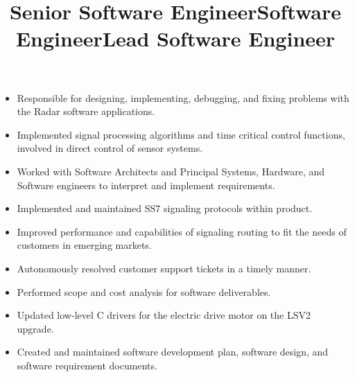 \documentclass[margin]{res}
\begin{document}
\begin{resume}
\title{\textbf{Senior Software Engineer}}
\begin{position}\phantom{spacing}
\begin{itemize}[noitemsep, topsep=0pt]
\item Responsible for designing, implementing, debugging, and fixing problems with the Radar software applications.
\item Implemented signal processing algorithms and time critical control functions, involved in direct control of sensor systems. 
\item Worked with Software Architects and Principal Systems, Hardware, and Software engineers to interpret and implement requirements. 
\end{itemize}
\end{position}

\title{\textbf{Software Engineer}}
\begin{position}\phantom{spacing}
\begin{itemize}[noitemsep, topsep=0pt]
\item Implemented and maintained SS7 signaling protocols within product. 
\item Improved performance and capabilities of signaling routing to fit the needs of customers in emerging markets. 
\item Autonomously resolved customer support tickets in a timely manner. 
\end{itemize}
\end{position}

\title{\textbf{Lead Software Engineer}}
\begin{position}\phantom{spacing}
\begin{itemize}[noitemsep, topsep=0pt]
\item Performed scope and cost analysis for software deliverables. 
\item Updated low-level C drivers for the electric drive motor on the LSV2 upgrade.  
\item Created and maintained software development plan, software design, and software requirement documents. 
\end{itemize}
\end{position}


\end{resume}
\end{document}
